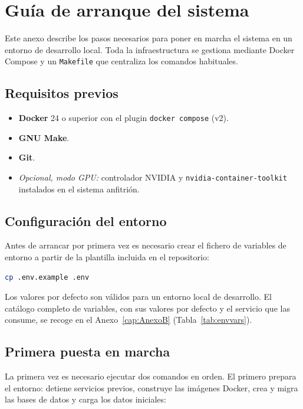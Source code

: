 \chapter{Guía de arranque del sistema}
\label{cap:AnexoK}

Este anexo describe los pasos necesarios para poner en marcha el sistema en un entorno de desarrollo local. Toda la infraestructura se gestiona mediante Docker Compose y un \texttt{Makefile} que centraliza los comandos habituales.

\section{Requisitos previos}

\begin{itemize}
 \item \textbf{Docker} 24 o superior con el plugin \texttt{docker compose} (v2).
 \item \textbf{GNU Make}.
 \item \textbf{Git}.
 \item \textit{Opcional, modo GPU:} controlador NVIDIA y \texttt{nvidia-container-toolkit} instalados en el sistema anfitrión.
\end{itemize}

\section{Configuración del entorno}

Antes de arrancar por primera vez es necesario crear el fichero de variables de entorno a partir de la plantilla incluida en el repositorio:

\begin{lstlisting}[language=bash]
cp .env.example .env
\end{lstlisting}

Los valores por defecto son válidos para un entorno local de desarrollo. El catálogo completo de variables, con sus valores por defecto y el servicio que las consume, se recoge en el Anexo~\ref{cap:AnexoB} (Tabla~\ref{tab:envvars}).

\section{Primera puesta en marcha}

La primera vez es necesario ejecutar dos comandos en orden. El primero prepara el entorno: detiene servicios previos, construye las imágenes Docker, crea y migra las bases de datos y carga los datos iniciales:

